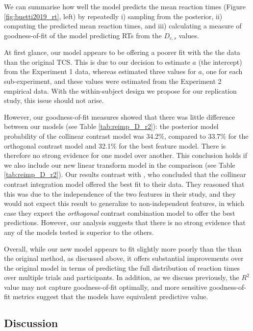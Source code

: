 \documentclass[preprint,12pt,authoryear]{elsarticle}
\begin{document}
We can summarise how well the model predicts the mean reaction times (Figure \ref{fig:buetti2019_rt}, left) by repeatedly i) sampling from the posterior, ii) computing the predicted mean reaction times, and iii) calculating a measure of goodness-of-fit of the model predicting RTs from the $D_{c,s}$ values.

At first glance, our model appears to be offering a poorer fit with the the data than the original TCS. This is due to our decision to estimate $a$ (the intercept) from the Experiment 1 data, whereas \cite{buetti2019predicting} estimated three values for $a$, one for each sub-experiment, and these values were estimated from the Experiment 2 empirical data. With the within-subject design we propose for our replication study, this issue should not arise. 

However, our goodness-of-fit measures showed that there was little difference between our models (see Table \ref{tab:reimp_D_r2}): the posterior model probability of the collinear contrast model was 34.2\%, compared to 33.7\% for the orthogonal contrast model and 32.1\% for the best feature model. There is therefore no strong evidence for one model over another. This conclusion holds if we also include our new linear transform model in the comparison (see Table \ref{tab:reimp_D_r2}). Our results contrast with \cite{buetti2019predicting}, who concluded that the collinear contrast integration model offered the best fit to their data. They reasoned that this was due to the independence of the two features in their study, and they would not expect this result to generalize to non-independent features, in which case they expect the \textit{orthogonal} contrast combination model to offer the best predictions. However, our analysis suggests that there is no strong evidence that any of the models tested is superior to the others. 

Overall, while our new model appears to fit slightly more poorly than the than the original method, as discussed above, it offers substantial improvements over the original model in terms of predicting the full distribution of reaction times over multiple trials and participants. In addition, as we discuss previously, the $R^2$ value may not capture goodness-of-fit optimally, and more sensitive goodness-of-fit metrics suggest that the models have equivalent predictive value.

\subsection{Discussion}
\end{document}
